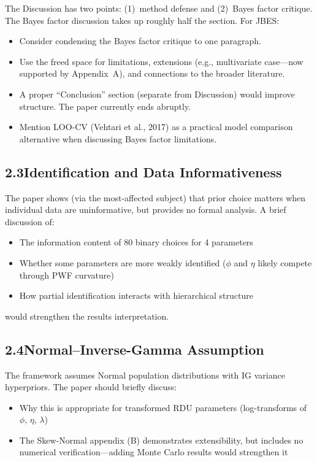 \documentclass[12pt,a4paper]{article}
\begin{document}
The Discussion has two points: (1)~method defense and (2)~Bayes factor critique.
The Bayes factor discussion takes up roughly half the section.  For JBES:
\begin{itemize}[leftmargin=1.5em]
\item Consider condensing the Bayes factor critique to one paragraph.
\item Use the freed space for limitations, extensions (e.g., multivariate
case---now supported by Appendix~A), and connections to the broader literature.
\item A proper ``Conclusion'' section (separate from Discussion) would improve
structure.  The paper currently ends abruptly.
\item Mention LOO-CV (Vehtari et al., 2017) as a practical model comparison
alternative when discussing Bayes factor limitations.
\end{itemize}

\subsection{2.3\quad Identification and Data Informativeness}

The paper shows (via the most-affected subject) that prior choice matters when
individual data are uninformative, but provides no formal analysis.  A brief
discussion of:
\begin{itemize}[leftmargin=1.5em]
\item The information content of 80 binary choices for 4 parameters
\item Whether some parameters are more weakly identified ($\phi$ and $\eta$
likely compete through PWF curvature)
\item How partial identification interacts with hierarchical structure
\end{itemize}
would strengthen the results interpretation.

\subsection{2.4\quad Normal--Inverse-Gamma Assumption}

The framework assumes Normal population distributions with IG variance
hyperpriors.  The paper should briefly discuss:
\begin{itemize}[leftmargin=1.5em]
\item Why this is appropriate for transformed RDU parameters (log-transforms of
$\phi$, $\eta$, $\lambda$)
\item The Skew-Normal appendix (B) demonstrates extensibility, but includes no
numerical verification---adding Monte Carlo results would strengthen it
\end{itemize}
\end{document}
